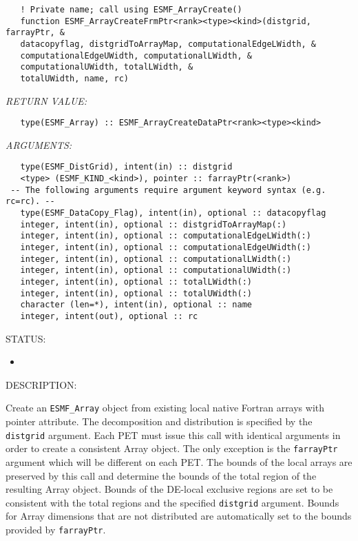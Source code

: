    
\begin{verbatim}   ! Private name; call using ESMF_ArrayCreate() 
   function ESMF_ArrayCreateFrmPtr<rank><type><kind>(distgrid, farrayPtr, & 
   datacopyflag, distgridToArrayMap, computationalEdgeLWidth, & 
   computationalEdgeUWidth, computationalLWidth, & 
   computationalUWidth, totalLWidth, & 
   totalUWidth, name, rc) 
   \end{verbatim}{\em RETURN VALUE:}
\begin{verbatim}   type(ESMF_Array) :: ESMF_ArrayCreateDataPtr<rank><type><kind> 
   \end{verbatim}{\em ARGUMENTS:}
\begin{verbatim}   type(ESMF_DistGrid), intent(in) :: distgrid 
   <type> (ESMF_KIND_<kind>), pointer :: farrayPtr(<rank>) 
 -- The following arguments require argument keyword syntax (e.g. rc=rc). --
   type(ESMF_DataCopy_Flag), intent(in), optional :: datacopyflag 
   integer, intent(in), optional :: distgridToArrayMap(:) 
   integer, intent(in), optional :: computationalEdgeLWidth(:) 
   integer, intent(in), optional :: computationalEdgeUWidth(:) 
   integer, intent(in), optional :: computationalLWidth(:) 
   integer, intent(in), optional :: computationalUWidth(:) 
   integer, intent(in), optional :: totalLWidth(:) 
   integer, intent(in), optional :: totalUWidth(:) 
   character (len=*), intent(in), optional :: name 
   integer, intent(out), optional :: rc 
   \end{verbatim}
{\sf STATUS:}
   \begin{itemize} 
   \item{} 
   \end{itemize} 
   
{\sf DESCRIPTION:\\ }

 
   Create an {\tt ESMF\_Array} object from existing local native Fortran 
   arrays with pointer attribute. The decomposition and distribution is 
   specified by the {\tt distgrid} argument. Each PET must issue this call 
   with identical arguments in order to create a consistent Array object. 
   The only exception is the {\tt farrayPtr} argument which will be different 
   on each PET. The bounds of the local arrays are preserved by this call and 
   determine the bounds of the total region of the 
   resulting Array object. Bounds of the DE-local exclusive regions are set 
   to be consistent with the total regions and the specified {\tt distgrid} 
   argument. Bounds for Array dimensions that are not distributed are 
   automatically set to the bounds provided by {\tt farrayPtr}. 
   
